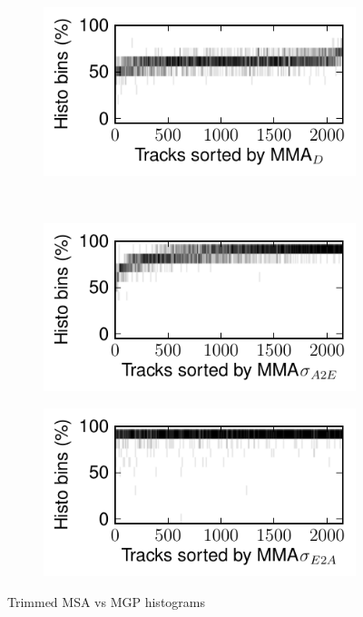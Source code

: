 \documentclass{article}
\begin{document}
\begin{figure}
      \begin{subfigure}[b]{0.25\textwidth}
              \includegraphics[width=\textwidth]{plots/histo-D-trim.pdf}
              \caption{}
              \label{fig:histo-D-trim}
      \end{subfigure}%
      ~ 
      \begin{subfigure}[b]{0.25\textwidth}
              \includegraphics[width=\textwidth]{plots/histo-DevA2E-trim.pdf}
              \caption{}
              \label{fig:histo-DevA2E-trim}
      \end{subfigure}%
       
      \begin{subfigure}[b]{0.25\textwidth}
              \includegraphics[width=\textwidth]{plots/histo-DevE2A-trim.pdf}
              \caption{}
              \label{fig:histo-DevE2A-trim}
      \end{subfigure}%

      \caption{Trimmed MSA vs MGP histograms}\label{fig:machine-eval-trim}
\end{figure}
\end{document}
